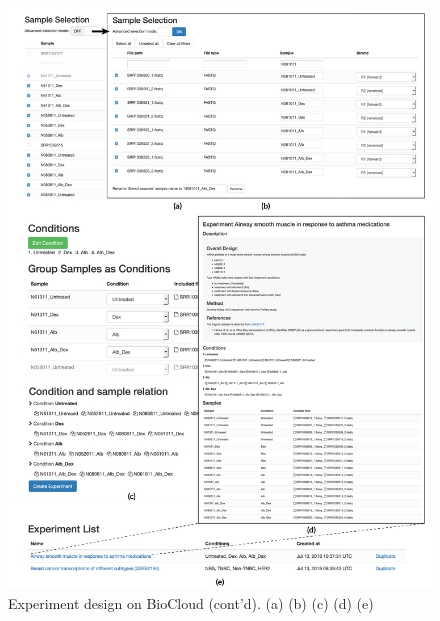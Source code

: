 \begin{figure}[!tbp]
\centering
\includegraphics[width=1\textwidth]{images/biocloud_experiment_sample_condition}
\caption[Experiment design on BioCloud (cont'd)]{
    Experiment design on BioCloud (cont'd).
    (a)
    (b)
    (c)
    (d)
    (e)
}
\label{fig:biocloud-experiment-design}
\end{figure}


